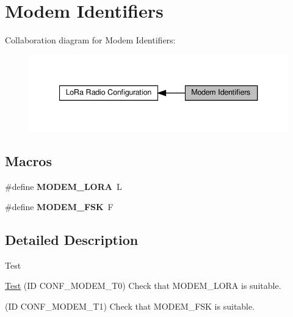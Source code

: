 \hypertarget{group__defines__radio__modem__configuration}{}\section{Modem Identifiers}
\label{group__defines__radio__modem__configuration}
Collaboration diagram for Modem Identifiers\+:
\nopagebreak
\begin{figure}[H]
\begin{center}
\leavevmode
\includegraphics[width=340pt]{group__defines__radio__modem__configuration}
\end{center}
\end{figure}
\subsection*{Macros}
\begin{DoxyCompactItemize}
\item 
\mbox{\label{group__defines__radio__modem__configuration_ga4214cb338675365d6e2e14fb1f8436d7}} 
\#define {\bfseries M\+O\+D\+E\+M\+\_\+\+L\+O\+RA}~\textquotesingle{}L\textquotesingle{}
\item 
\mbox{\label{group__defines__radio__modem__configuration_ga8b344b5ca597731ca0ccabcdee4a24a2}} 
\#define {\bfseries M\+O\+D\+E\+M\+\_\+\+F\+SK}~\textquotesingle{}F\textquotesingle{}
\end{DoxyCompactItemize}


\subsection{Detailed Description}
\begin{DoxyRefDesc}{Test}
\item[\hyperlink{test__test000030}{Test}](ID C\+O\+N\+F\+\_\+\+M\+O\+D\+E\+M\+\_\+\+T0) Check that M\+O\+D\+E\+M\+\_\+\+L\+O\+RA is suitable. 

(ID C\+O\+N\+F\+\_\+\+M\+O\+D\+E\+M\+\_\+\+T1) Check that M\+O\+D\+E\+M\+\_\+\+F\+SK is suitable.\end{DoxyRefDesc}
